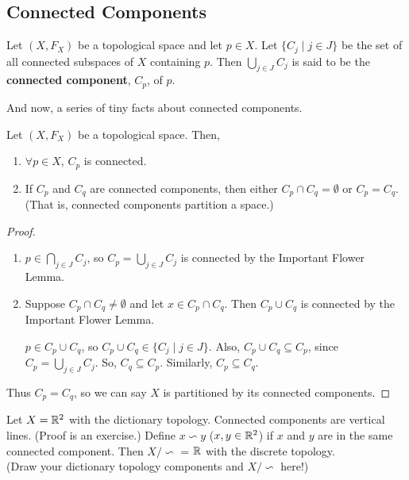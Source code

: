\subsection{Connected Components} 
\begin{definition}
	Let $(X, F_X)$ be a topological space and let $p\in X$. Let $\{C_j\mid j\in J\}$ be the set of all connected subspaces of $X$ containing $p$. Then ${\displaystyle\bigcup_{j\in J}C_j}$ is said to be the \textbf{connected component}, $C_p$, of $p$. 
\end{definition}

And now, a series of tiny facts about connected components. 
\begin{smallfact}
	Let $(X, F_X)$ be a topological space. Then, 
	\begin{enumerate}
		\item $\forall p \in X$, $C_p$ is connected. 
		\item If $C_p$ and $C_q$ are connected components, then either $C_p\cap C_q = \emptyset$ or $C_p = C_q$. (That is, connected components partition a space.) 
	\end{enumerate}
	
\begin {proof} 
\begin{enumerate}
	\item $p\in {\displaystyle\bigcap_{j\in J} C_j}$, so $C_p = {\displaystyle\bigcup_{j\in J} C_j}$ is connected by the Important Flower Lemma. 
	\item Suppose $C_p \cap C_q \neq \emptyset$ and let $x\in C_p \cap C_q$. Then $C_p \cup C_q$ is connected by the Important Flower Lemma.
	
	$p\in C_p \cup C_q$, so $C_p \cup C_q \in \{C_j\mid j\in J\}$. Also, $C_p \cup C_q \subseteq C_p$, since $C_p = {\displaystyle\bigcup_{j\in J} C_j}$. So, $C_q \subseteq C_p$. Similarly, $C_p \subseteq C_q$. 
\end{enumerate}
Thus $C_p = C_q$, so we can say $X$ is partitioned by its connected components. 
\end{proof}
\end{smallfact}
\begin{example}
Let $X = \mathbb R^2$ with the dictionary topology. Connected components are vertical lines. (Proof is an exercise.) Define $x\backsim y$ ($x, y \in \mathbb R^2$) if $x$ and $y$ are in the same connected component. Then $X/\backsim$ = $\mathbb R$ with the discrete topology. \\
(Draw your dictionary topology components and $X/\backsim$ here!)\\
\placeholder 
\end{example}

